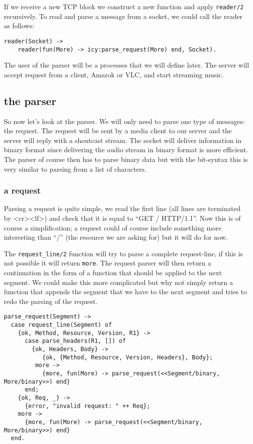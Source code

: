 \documentclass[a4paper,dvips,11pt]{article}
\begin{document}
If we receive a new TCP block we construct a new function and apply
{\tt reader/2} recursively. To read and parse a message from a socket,
we could call the reader as follows:

\begin{verbatim}
reader(Socket) ->
    reader(fun(More) -> icy:parse_request(More) end, Socket).
\end{verbatim}

The user of the parser will be a processes that we will define
later. The server will accept request from a client, Amarok or VLC, and
start streaming music.

\subsection{the parser}

So now let's look at the parser. We will only need to parse one type
of messages: the request. The request will be sent by a media client
to our server and the server will reply with a shoutcast stream. The
socket will deliver information in binary format since delivering the
audio stream in binary format is more efficient. The parser of course
then has to parse binary data but with the bit-syntax this is very
similar to parsing from a list of characters.


\subsubsection{a request}

Parsing a request is quite simple, we read the first line (all lines
are terminated by \textless cr\textgreater \textless lf\textgreater)
and check that it is equal to ``GET / HTTP/1.1''. Now this is of
course a simplification; a request could of course include something
more interesting than ``/'' (the resource we are asking for) but it
will do for now.

The {\tt request\_line/2} function will try to parse a complete request-line, if this
is not possible it will return {\tt more}. The request parser
will then return a continuation in the form of a function that should
be applied to the next segment. We could make this more complicated
but why not simply return a function that appends the segment that we
have to the next segment and tries to redo the parsing of the request.

\begin{verbatim}
parse_request(Segment) ->
  case request_line(Segment) of
    {ok, Method, Resource, Version, R1} ->
      case parse_headers(R1, []) of
        {ok, Headers, Body} ->
           {ok, {Method, Resource, Version, Headers}, Body};
         more ->
           {more, fun(More) -> parse_request(<<Segment/binary, More/binary>>) end}
      end;
    {ok, Req, _} ->
      {error, "invalid request: " ++ Req};
    more ->
      {more, fun(More) -> parse_request(<<Segment/binary, More/binary>>) end}
  end.
\end{verbatim}
\end{document}
